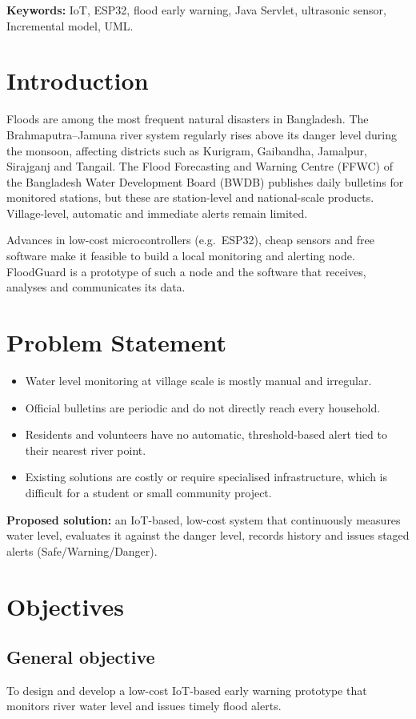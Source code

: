 \documentclass[12pt,a4paper]{article}
\begin{document}
\medskip\noindent\textbf{Keywords:} IoT, ESP32, flood early warning, Java Servlet, ultrasonic sensor, Incremental model, UML.

\section{Introduction}
Floods are among the most frequent natural disasters in Bangladesh. The Brahmaputra--Jamuna river system regularly rises above its danger level during the monsoon, affecting districts such as Kurigram, Gaibandha, Jamalpur, Sirajganj and Tangail. The Flood Forecasting and Warning Centre (FFWC) of the Bangladesh Water Development Board (BWDB) publishes daily bulletins for monitored stations, but these are station-level and national-scale products. Village-level, automatic and immediate alerts remain limited.

Advances in low-cost microcontrollers (e.g.\ ESP32), cheap sensors and free software make it feasible to build a local monitoring and alerting node. FloodGuard is a prototype of such a node and the software that receives, analyses and communicates its data.

\section{Problem Statement}
\begin{itemize}[noitemsep]
\item Water level monitoring at village scale is mostly manual and irregular.
\item Official bulletins are periodic and do not directly reach every household.
\item Residents and volunteers have no automatic, threshold-based alert tied to their nearest river point.
\item Existing solutions are costly or require specialised infrastructure, which is difficult for a student or small community project.
\end{itemize}
\textbf{Proposed solution:} an IoT-based, low-cost system that continuously measures water level, evaluates it against the danger level, records history and issues staged alerts (Safe/Warning/Danger).

\section{Objectives}
\subsection{General objective}
To design and develop a low-cost IoT-based early warning prototype that monitors river water level and issues timely flood alerts.
\end{document}
